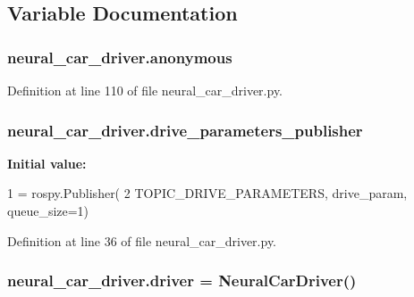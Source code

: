\subsection{Variable Documentation}
\subsubsection[{\texorpdfstring{anonymous}{anonymous}}]{\setlength{\rightskip}{0pt plus 5cm}neural\+\_\+car\+\_\+driver.\+anonymous}\hypertarget{namespaceneural__car__driver_ae254923f6ec524f563a598feeee010b9}{}\label{namespaceneural__car__driver_ae254923f6ec524f563a598feeee010b9}


Definition at line 110 of file neural\+\_\+car\+\_\+driver.\+py.

\subsubsection[{\texorpdfstring{drive\+\_\+parameters\+\_\+publisher}{drive_parameters_publisher}}]{\setlength{\rightskip}{0pt plus 5cm}neural\+\_\+car\+\_\+driver.\+drive\+\_\+parameters\+\_\+publisher}\hypertarget{namespaceneural__car__driver_ac075b2fda9db2b43e338511958cfe9c2}{}\label{namespaceneural__car__driver_ac075b2fda9db2b43e338511958cfe9c2}
{\bfseries Initial value\+:}
\begin{DoxyCode}
1 = rospy.Publisher(
2     TOPIC\_DRIVE\_PARAMETERS, drive\_param, queue\_size=1)
\end{DoxyCode}


Definition at line 36 of file neural\+\_\+car\+\_\+driver.\+py.

\subsubsection[{\texorpdfstring{driver}{driver}}]{\setlength{\rightskip}{0pt plus 5cm}neural\+\_\+car\+\_\+driver.\+driver = {\bf Neural\+Car\+Driver}()}\hypertarget{namespaceneural__car__driver_a277afd40b4a20897467cac1f802344ee}{}\label{namespaceneural__car__driver_a277afd40b4a20897467cac1f802344ee}



